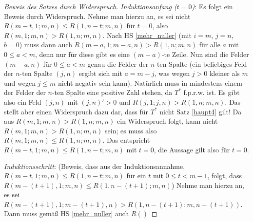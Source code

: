 \begin{proof}[Beweis des Satzes durch Widerspruch]
    \textit{Induktionsanfang ($t=0$)}: Es folgt ein Beweis durch Widerspruch. Nehme man hierzu an, es sei nicht 
    $R(m-t, 1; m, n)\leq R(1, n-t; m, n)$ für $t=0$, also $R(m, 1; m, n)>R(1, n; m, n)$. Nach 
    HS \ref{mehr_nuller} (mit $i=m$, $j=n$, $b=0$) muss dann auch $R(m-a, 1; m-a, n) > R(1, n; m, n)$ für alle 
    $a$ mit $0\leq a<m$, denn nur für diese gibt es eine $(m-a)$-te Zeile. Nun sind die Felder $(m-a, n)$ für $0\leq 
    a<m$ genau die Felder der $n$-ten Spalte (ein beliebiges Feld der $n$-ten Spalte $(j, n)$ ergibt sich mit $a=m-j$, 
    was wegen $j>0$ kleiner als $m$ und wegen $j\leq m$ nicht negativ sein kann). Natürlich muss in mindestens einem 
    der Felder der $n$-ten Spalte eine positive Zahl stehen, da $T^*$ f.p.r.w. ist. Es gibt also ein Feld $(j, n)$ 
    mit $(j, n)'>0$ und $R(j, 1; j, n)>R(1, n; m, n)$. Das stellt aber einen Widerspruch dazu dar, dass für $T^*$ nicht 
    Satz \ref{haupt4} gilt! Da aus $R(m, 1; m, n)>R(1, n; m, n)$ ein Widerspruch folgt, kann nicht $R(m, 1; m, n)>
    R(1, n; m, n)$ sein; es muss also $R(m, 1; m, n)\leq R(1, n; m, n)$. Das entspricht $R(m-t, 1; m, n)\leq 
    R(1, n-t; m, n)$ mit $t=0$, die Aussage gilt also für $t=0$.

    \textit{Induktionsschritt}: (Beweis, dass aus der Induktionsannahme, $R(m-t, 1; m, n)\leq R(1, n-t; m, n)$ für 
    ein $t$ mit $0\leq t<m-1$, folgt, dass $R(m-(t+1), 1; m, n)\leq R(1, n-(t+1); m, n)$) Nehme man hierzu an, es sei 
    $R(m-(t+1), 1; m-(t+1), n)>R(1, n-(t+1); m, n-(t+1))$. Dann muss gemäß HS \ref{mehr_nuller} auch 
    $R()$




\end{proof}
